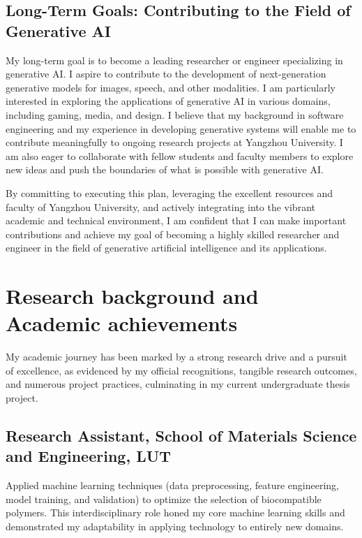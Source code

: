 \documentclass[12pt,a4paper]{article}
\begin{document}
\begin{CJK*}{UTF8}{gbsn}
\subsection*{Long-Term Goals: Contributing to the Field of Generative AI }
My long-term goal is to become a leading researcher or engineer specializing in generative AI. I aspire to contribute to the development of next-generation generative models for images, speech, and other modalities. I am particularly interested in exploring the applications of generative AI in various domains, including gaming, media, and design. I believe that my background in software engineering and my experience in developing generative systems will enable me to contribute meaningfully to ongoing research projects at Yangzhou University. I am also eager to collaborate with fellow students and faculty members to explore new ideas and push the boundaries of what is possible with generative AI.\newline

By committing to executing this plan, leveraging the excellent resources and faculty of Yangzhou University, and actively integrating into the vibrant academic and technical environment, I am confident that I can make important contributions and achieve my goal of becoming a highly skilled researcher and engineer in the field of generative artificial intelligence and its applications.\newline


\section*{Research background and Academic achievements}

My academic journey has been marked by a strong research drive and a pursuit of excellence, as evidenced by my official recognitions, tangible research outcomes, and numerous project practices, culminating in my current undergraduate thesis project.

\subsection*{Research Assistant, School of Materials Science and Engineering, LUT}
Applied machine learning techniques (data preprocessing, feature engineering, model training, and validation) to optimize the selection of biocompatible polymers. This interdisciplinary role honed my core machine learning skills and demonstrated my adaptability in applying technology to entirely new domains.



\end{CJK*}
\end{document}
